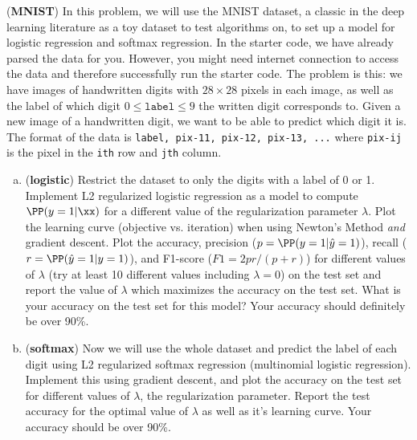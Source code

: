 \documentclass[12pt,letterpaper,fleqn]{hmcpset}
\begin{document}
\begin{problem}[2]
	(\textbf{MNIST})
	In this problem, we will use the MNIST dataset, a classic in the deep learning literature as a toy dataset to test
	algorithms on, to set up a model for logistic regression and softmax regression. In the starter code, we have already parsed the data for you. However, you might need internet connection to access the data and therefore successfully run the starter code.
	\newline
	\newline
	The problem is this: we have images of handwritten
	digits with $28\times 28$ pixels in each image, as well as the label of which digit $0 \leq \texttt{label} \leq 9$ the written
	digit corresponds to. Given a new image of a handwritten digit, we want to be
	able to predict which digit it is.
	The format of the data is \texttt{label, pix-11, pix-12, pix-13, ...}
	where \texttt{pix-ij} is the pixel in the \texttt{ith} row and \texttt{jth} column.
	\newline
	\begin{enumerate}[(a)]
		\item (\textbf{logistic}) Restrict the dataset to only the digits with a label
		      of 0 or 1. Implement L2 regularized logistic regression as a model to compute
		      $\PP(y=1|\xx)$ for a different value of the regularization parameter $\lambda$.
		      Plot the learning curve (objective vs. iteration) when using Newton's Method
		      \textit{and} gradient descent.
		      Plot the accuracy, precision ($p = \PP(y=1 | \hat y=1)$), recall ($r = \PP(\hat y=1 | y=1)$),
		      and F1-score ($F1 = 2pr / (p+r)$) for different values of $\lambda$ (try at least
		      10 different values including $\lambda = 0$) on the test set and report the
		      value of $\lambda$ which maximizes the accuracy on the test set. What is your
		      accuracy on the test set for this model? Your accuracy should definitely be
		      over 90\%.

		\item (\textbf{softmax}) Now we will use the whole dataset and predict the label
		      of each digit using L2 regularized softmax regression (multinomial logistic
		      regression). Implement this using gradient descent, and plot the accuracy
		      on the test set for different values of $\lambda$, the regularization parameter.
		      Report the test accuracy for the optimal value of $\lambda$ as well as it's
		      learning curve. Your accuracy should be over 90\%.

	\end{enumerate}
\end{problem}
\begin{solution}
	\vfill
\end{solution}
\newpage
\end{document}
